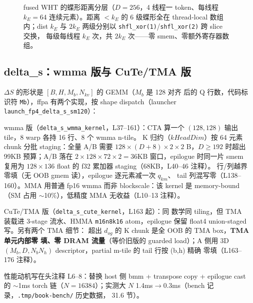 \begin{figure}[H]
\caption{fused WHT 的蝶形距离分层（$D{=}256$，4 线程一 token、每线程 $k_E{=}64$
连续元素）。距离 $<k_E$ 的 6 级蝶形全在 thread-local 数组内；dist $k_E$ 与
$2k_E$ 两级分别以 \texttt{shfl\_xor(1)}/\texttt{shfl\_xor(2)} 跨 slice 交换，
每级每线程 $k_E$ 次，共 $2k_E$ 次——零 smem、零额外寄存器数组。}
\label{fig:31-wht-butterfly}
\end{figure}

\subsection{delta\_s：wmma 版与 CuTe/TMA 版}

$\Delta S$ 的形状是 $[B,H,M_b,N_{kv}]$ 的 GEMM（$M_b$ 是 128 对齐
后的 Q 行数，代码标识符 \texttt{Mb}），ffpa 有两个实现，按 shape
dispatch（launcher
\texttt{launch\_fp4\_delta\_s\_sm120}）：

wmma 版（\texttt{delta\_s\_wmma\_kernel}，L37--161）：CTA
算一个 $(128,128)$ 输出 tile，8 warp 各持 16 行、8 个 wmma n-tile。
K 归约（$kHeadDim$）按 64 元素 chunk 分批 staging：全量 A/B 需要
$128\times(D{+}8)\times2\times2$ B，$D\ge192$ 时超出 99KB 预算；A/B 落在
$2\times128\times72\times2=36$KB 窗口，epilogue 时同一片 smem 复用为
$128\times136$ float 的 f32 累加器 staging（68KB，L40--46 注释）。
行/列越界零填（无 OOB gmem 读），epilogue 逐元素减一次 $q_{km}$、
tail 列混写零（L138--160）。MMA 用普通 fp16 wmma 而非
blockscale：该 kernel 是 memory-bound（SM 占用 $\sim$10\%），低精度
MMA 无收益（L10--13 注释）。

CuTe/TMA 版（\texttt{delta\_s\_cute\_kernel}，L163 起）：同
数学同 tiling，但 TMA 装载进 3-stage 流水、HMMA \texttt{m16n8k16}
atom，epilogue 保留 float4 union-staged 写。另有两个 TMA 细节：
超出 $d_{og}$ 的 K chunk 是全 OOB 的 TMA box，\textbf{TMA 单元内部零
填、零 DRAM 流量}（等价旧版的 guarded load）；A 侧用 3D
$(M_b,D,N_bN_h)$ descriptor，partial m-tile 的 tail 行按 (b,h) 精确
零填（L163--176 注释）。

性能动机写在头注释 L6--8：替换 host 侧 bmm + transpose copy +
epilogue cast 的 $\sim$1ms torch 链（$N{=}16384$）；实测大 $N$
1.4ms$\to$0.3ms（bench 记录，\texttt{.tmp/book-bench/} 历史数据，
31.6 节）。

